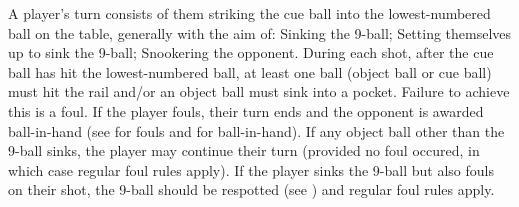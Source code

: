 
 A player's turn consists of them striking the cue ball into the lowest-numbered ball on the table, generally with the aim of:%
\subsubruleitem Sinking the 9-ball;%
\subsubruleitem Setting themselves up to sink the 9-ball;%
\subsubruleitem Snookering the opponent.%
 During each shot, after the cue ball has hit the lowest-numbered ball, at least one ball (object ball or cue ball) must hit the rail and/or an object ball must sink into a pocket. Failure to achieve this is a foul.
 \FootOnGround%
 If the player fouls, their turn ends and the opponent is awarded ball-in-hand (see  for fouls and  for ball-in-hand).%
 If any object ball other than the 9-ball sinks, the player may continue their turn (provided no foul occured, in which case regular foul rules apply).%
 If the player sinks the 9-ball but also fouls on their shot, the 9-ball should be respotted (see ) and regular foul rules apply.%
 {}%
 {}%


